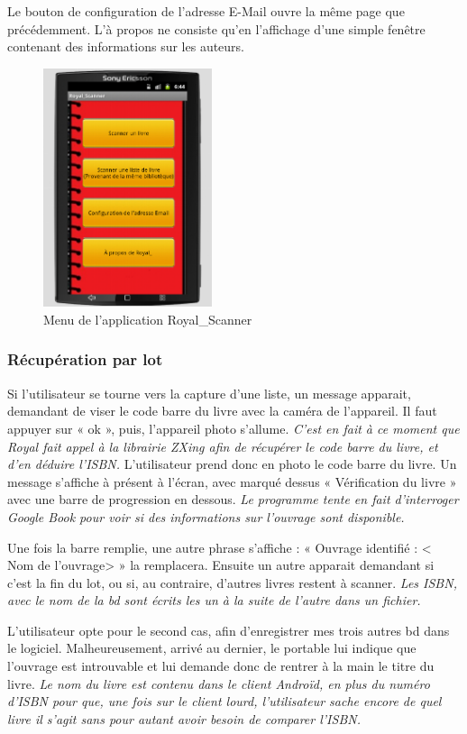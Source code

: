 Le bouton de configuration de l'adresse E-Mail ouvre la même page que précédemment. 
L'à propos ne consiste qu'en l'affichage d'une simple fenêtre contenant des informations sur les auteurs.

\begin{figure}[h]
\begin{center}
\includegraphics[height=7cm]{../img/Royal_Scanner_menu.png}
\end{center}
\caption{Menu de l'application Royal\_Scanner}
\end{figure}

\subsubsection{Récupération par lot}
Si l'utilisateur se tourne vers la capture d'une liste, 
un message apparait, demandant de viser le code barre du livre avec la caméra de l'appareil.
Il faut appuyer sur « ok », puis, l'appareil photo s'allume. 
\emph{C'est en fait à ce moment que Royal fait appel à la librairie ZXing afin de récupérer le code barre du livre, et d'en déduire l'ISBN.} 
L'utilisateur prend donc en photo le code barre du livre.
Un message s'affiche à présent à l'écran, avec marqué dessus « Vérification du livre » avec une barre de progression en dessous.
\emph{Le programme tente en fait d'interroger Google Book pour voir si des informations sur l'ouvrage sont disponible.}

Une fois la barre remplie, une autre phrase s'affiche : « Ouvrage identifié : < Nom de l'ouvrage> » la remplacera.
Ensuite un autre apparait demandant si c'est la fin du lot, ou si, au contraire, d'autres livres restent à scanner. 
\emph{Les ISBN, avec le nom de la bd sont écrits les un à la suite de l'autre dans un fichier.} 

L'utilisateur opte pour le second cas, afin d'enregistrer mes trois autres bd dans le logiciel. 
Malheureusement, arrivé au dernier, le portable lui indique que l'ouvrage est introuvable et lui demande donc de rentrer à la main le titre du livre. 
\emph{Le nom du livre est contenu dans le client Androïd, en plus du numéro d'ISBN pour que, une fois sur le client lourd,
	l'utilisateur sache encore de quel livre il s'agit sans pour autant avoir besoin de comparer l'ISBN.}

